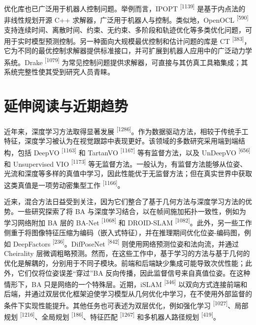 优化库也已广泛用于机器人控制问题。举例而言，IPOPT \textsuperscript{[1139]} 是基于内点法的非线性规划开源 C++ 求解器，广泛用于机器人与控制。类似地，OpenOCL \textsuperscript{[590]} 支持连续时间、离散时间、约束、无约束、多阶段和轨迹优化等多类优化问题，可用于实时模型预测控制。另一种面向大规模最优控制和估计问题的库是 CT \textsuperscript{[383]}，它为不同的最优控制求解器提供标准接口，并可扩展到机器人应用中的广泛动力学系统。Drake \textsuperscript{[1079]} 为常见控制问题提供求解器，可直接与其仿真工具箱集成；其系统完整性使其受到研究人员青睐。

\section{延伸阅读与近期趋势}

近年来，深度学习方法取得显著发展 \textsuperscript{[1286]}。作为数据驱动方法，相较于传统手工特征，深度学习被认为在视觉跟踪中表现更好。该领域的多数研究采用端到端结构，包括 DeepVO \textsuperscript{[1163]} 和 TartanVO \textsuperscript{[1167]} 等有监督方法，以及 UnDeepVO \textsuperscript{[656]} 和 Unsupervised VIO \textsuperscript{[1173]} 等无监督方法。一般认为，有监督方法能够从位姿、光流和深度等多样的真值中学习，因此性能优于无监督方法；但在真实世界中获取这类真值是一项劳动密集型工作 \textsuperscript{[1166]}。

近来，混合方法日益受到关注，因为它们整合了基于几何方法与深度学习方法的优势。一些研究探索了将 BA 与深度学习结合，以在帧间施加拓扑一致性，例如为学习网络附加 BA 层的 BA-Net \textsuperscript{[1068]} 和 DROID-SLAM \textsuperscript{[1082]}。此外，另一些工作侧重于将图像特征压缩为编码（嵌入式特征），并在推理期间优化位姿-编码图，例如 DeepFactors \textsuperscript{[236]}。DifPoseNet \textsuperscript{[842]} 则使用网络预测位姿和法向流，并通过 Cheirality 层微调粗略预测。然而，在这些工作中，基于学习的方法与基于几何的优化是解耦的，分别用于不同子模块。前端和后端缺少集成可能导致次优性能；此外，它们仅将位姿误差“穿过”BA 反向传播，因此监督信号来自真值位姿。在这种情形下，BA 只是网络的一个特殊层。近期，iSLAM \textsuperscript{[346]} 以双向方式连接前端和后端，并通过双层优化框架迫使学习模型从几何优化中学习，在不使用外部监督的条件下实现性能提升。其他任务也可表述为双层优化，例如强化学习 \textsuperscript{[1027]}、局部规划 \textsuperscript{[1216]}、全局规划 \textsuperscript{[186]}、特征匹配 \textsuperscript{[1267]} 和多机器人路径规划 \textsuperscript{[419]}。
